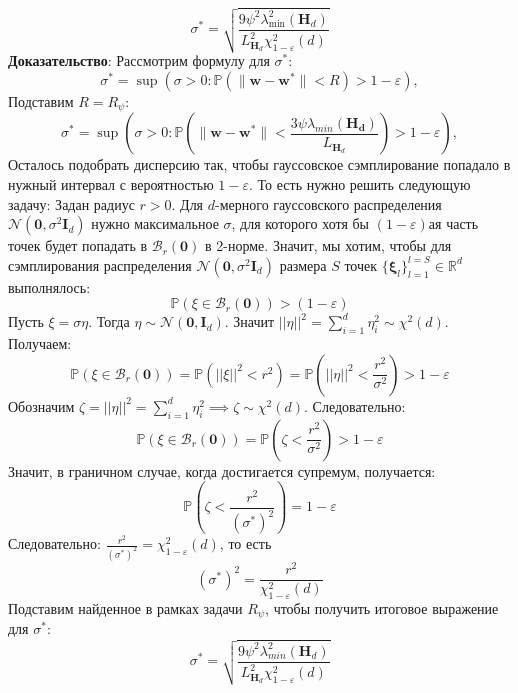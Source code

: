 \documentclass[11pt,a4paper]{article}
\begin{document}
$$\sigma^{*} =
\sqrt{\frac{9 \psi^2 \lambda_{\min}^2(\mathbf{H}_d)}{{L}_{\mathbf{H}_d}^2 \chi^2_{1-\varepsilon}(d)}}$$
\textbf{Доказательство}:\newline
Рассмотрим формулу для $\sigma^*$:\newline
$$\sigma^* = \sup (\sigma > 0 :\mathbb{P}\left(\|\mathbf{w}-\mathbf{w}^*\| < R\right) > 1-\varepsilon),$$
Подставим $R = R_{\psi}$:
$$\sigma^* = \sup (\sigma > 0 :\mathbb{P}\!\left(\|\mathbf{w}-\mathbf{w}^*\| < \frac{3\psi \lambda_{min}(\mathbf{H_d})}{L_{\mathbf{H}_d}}\right) > 1-\varepsilon),$$
Осталось подобрать дисперсию так, чтобы гауссовское сэмплирование попадало в нужный интервал с вероятностью $1-\varepsilon$. \newline
То есть нужно решить следующую задачу:\newline
Задан радиус $r > 0$. \newline
Для $d$-мерного гауссовского распределения $\mathcal{N}(\mathbf{0}, \sigma^2 \mathbf{I}_d)$ нужно максимальное $\sigma$, для которого хотя бы $(1-\varepsilon)$ая часть точек будет попадать в $\mathcal{B}_r(\mathbf{0})$ в 2-норме. \newline
Значит, мы хотим, чтобы для сэмплирования распределения $\mathcal{N}(\mathbf{0}, \sigma^2 \mathbf{I}_d)$ размера $S$ точек $\{\mathbf{\xi}_l\}^{l=S}_{l=1}\in\mathbb{R}^d$ выполнялось:
$$\mathbb{P} ( \xi\in\mathcal{B}_r(\mathbf{0}) ) > (1-\varepsilon)$$
Пусть $\xi = \sigma \eta$. \newline
Тогда $\eta \sim \mathcal{N}(\mathbf{0}, \mathbf{I}_d)$. Значит $||\eta||^2= \displaystyle \sum_{i=1}^d \eta_i^2 \sim \chi^2(d)$. \newline
Получаем:
$$\mathbb{P}\left(\xi\in\mathcal{B}_r(\mathbf{0})\right) = \mathbb{P}\left(||\xi||^2 < r^2\right) = \mathbb{P}\left(||\eta||^2 < \frac{r^2}{\sigma^2}\right) > 1 - \varepsilon$$
Обозначим $\zeta =||\eta||^2= \displaystyle \sum_{i=1}^d \eta_i^2 \implies \zeta \sim \chi^2(d).$ Следовательно:
$$\mathbb{P}\left(\xi\in\mathcal{B}_r(\mathbf{0})\right)=\mathbb{P}\left(\zeta < \frac{r^2}{\sigma^2}\right) > 1-\varepsilon$$
Значит, в граничном случае, когда достигается супремум, получается:
$$\mathbb{P}\left(\zeta < \frac{r^2}{(\sigma^*)^2}\right) = 1-\varepsilon$$
Следовательно:
$\frac{r^2}{(\sigma^*)^2} = \chi^2_{1-\varepsilon}(d)$, то есть 
$$(\sigma^*)^2=\frac{r^2}{\chi^2_{1-\varepsilon}(d)}$$
Подставим найденное в рамках задачи $R_{\psi}$, чтобы получить итоговое выражение для $\sigma^*$:
$$\sigma^* = \sqrt{\frac{9\psi^2 \lambda_{min}^2(\mathbf{H}_d)}{L_{\mathbf{H}_d}^2\chi^2_{1-\varepsilon}(d)}}$$
\end{document}
